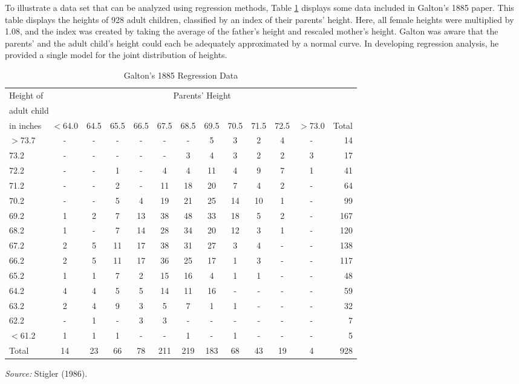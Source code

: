 
To illustrate a data set that can be analyzed using regression
methods, Table \ref{T1:Galton} displays some data included in
Galton's 1885 paper. This
table displays the heights of 928 adult children, classified by an
index of their parents' height. Here, all female heights were
multiplied by 1.08, and the index was created by taking the average
of the father's height and rescaled mother's height. Galton was
aware that the parents' and the adult child's height could each be
adequately approximated by a normal curve. In developing regression
analysis, he provided a single model for the joint distribution of
heights.

\begin{table}[h] 
\caption{\label{T1:Galton} Galton's 1885 Regression Data}
\begin{tabular}{l|ccccccccccc|r}
\hline
Height of &  \multicolumn{12}{c}{Parents' Height} \\
\multicolumn{2}{l}{adult child} \\
in inches & $<$64.0 & 64.5 & 65.5 & 66.5 & 67.5 & 68.5 &
69.5 & 70.5 & 71.5 & 72.5 & $>$73.0 & Total \\
\hline
$>$73.7 & - & - & - & - & - & - & 5 & 3 & 2 & 4 & - & 14 \\
73.2 & - & - & - & - & - & 3 & 4 & 3 & 2 & 2 & 3 & 17 \\
72.2 & - & - & 1 & - & 4 & 4 & 11 & 4 & 9 & 7 & 1 & 41 \\
71.2 & - & - & 2 & - & 11 & 18 & 20 & 7 & 4 & 2 & - & 64 \\
70.2 & - & - & 5 & 4 & 19 & 21 & 25 & 14 & 10 & 1 & - & 99 \\
69.2 & 1 & 2 & 7 & 13 & 38 & 48 & 33 & 18 & 5 & 2 & - & 167 \\
68.2 & 1 & - & 7 & 14 & 28 & 34 & 20 & 12 & 3 & 1 & - & 120 \\
67.2 & 2 & 5 & 11 & 17 & 38 & 31 & 27 & 3 & 4 & - & - & 138 \\
66.2 & 2 & 5 & 11 & 17 & 36 & 25 & 17 & 1 & 3 & - & - & 117 \\
65.2 & 1 & 1 & 7 & 2 & 15 & 16 & 4 & 1 & 1 & - & - & 48 \\
64.2 & 4 & 4 & 5 & 5 & 14 & 11 & 16 & - & - & - & - & 59 \\
63.2 & 2 & 4 & 9 & 3 & 5 & 7 & 1 & 1 & - & - & - & 32 \\
62.2 & - & 1 & - & 3 & 3 & - & - & - & - & - & - & 7 \\
$<$61.2 & 1 & 1 & 1 & - & - & 1 & - & 1 & - & - & - & 5 \\ \hline
Total & 14 & 23 & 66 & 78 & 211 & 219 & 183 & 68 & 43 & 19 & 4 & 928 \\
\hline
\end{tabular}
\textit{Source: }Stigler (1986).
\end{table}

